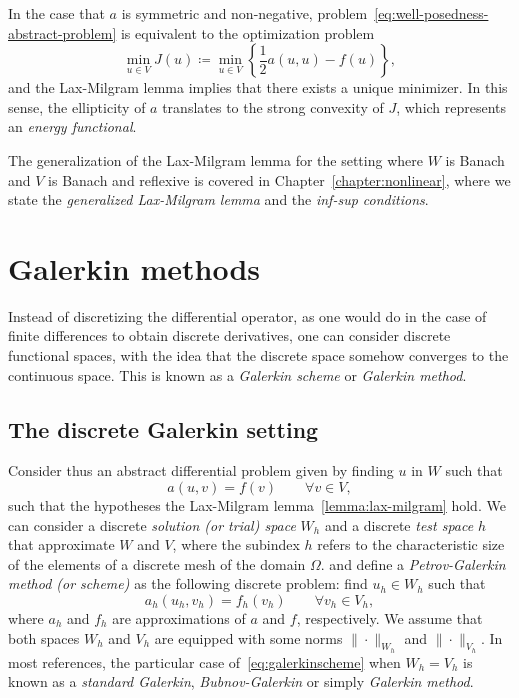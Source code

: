 In the case that $a$ is symmetric and non-negative, problem~\ref{eq:well-posedness-abstract-problem} is equivalent to the optimization problem 
\begin{equation*}
    \min_{u\in V} J(u) \coloneqq \min_{u\in V} \left\{\frac{1}{2}a(u,u) - f(u)\right\},
\end{equation*}
and the Lax-Milgram lemma implies that there exists a unique minimizer. In this sense, the ellipticity of $a$ translates to the strong convexity of $J$, which represents an \emph{energy functional}. 

The generalization of the Lax-Milgram lemma for the setting where $W$ is Banach and $V$ is Banach and reflexive is covered in Chapter~\ref{chapter:nonlinear}, where we state the \emph{generalized Lax-Milgram lemma} and the \emph{inf-sup conditions}. 

\section{Galerkin methods}\label{sec:galerkin}
Instead of discretizing the differential operator, as one would do in the case of finite differences to obtain discrete derivatives, one can consider discrete functional spaces, with the idea that the discrete space somehow converges to the continuous space. This is known as a \emph{Galerkin scheme} or \emph{Galerkin method}.

\subsection{The discrete Galerkin setting}
Consider thus an abstract differential problem given by finding $u$ in $W$ such that
\begin{equation}
    a(u, v) = f(v) \qquad \forall v \in V,
\end{equation}
such that the hypotheses the Lax-Milgram lemma~\ref{lemma:lax-milgram} hold. We can consider a discrete \emph{solution (or trial) space} $W_h$ and a discrete \emph{test space} $h$ that approximate $W$ and $V$, where the subindex $h$ refers to the characteristic size of the elements of a discrete mesh of the domain $\Omega$. and define a \emph{Petrov-Galerkin method (or scheme)} as the following discrete problem: find $u_h \in W_h$ such that 
\begin{equation}\label{eq:galerkinscheme}
    a_h(u_h, v_h) = f_h(v_h) \qquad \forall v_h \in V_h,
\end{equation}
where $a_h$ and $f_h$ are approximations of $a$ and $f$, respectively. 
We assume that both spaces $W_h$ and $V_h$ are equipped with some norms $\|\cdot\|_{W_h}$ and $\|\cdot\|_{V_h}$. In most references, the particular case of~\ref{eq:galerkinscheme} when $W_h = V_h$ is known as a \emph{standard Galerkin}, \emph{Bubnov-Galerkin} or simply \emph{Galerkin method}. 

